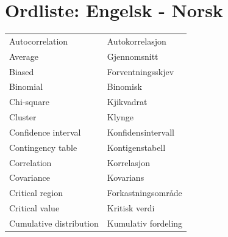 \section{Ordliste: Engelsk - Norsk}
\small
\begin{center}
\begin{tabular}{ll}
Autocorrelation & Autokorrelasjon  \\
Average         & Gjennomsnitt  \\
Biased          & Forventningsskjev \\
Binomial        & Binomisk \\
Chi-square      & Kjikvadrat \\
Cluster         & Klynge \\
Confidence interval & Konfidensintervall \\
Contingency table &   Kontigenstabell \\
Correlation    &  Korrelasjon \\
Covariance      & Kovarians \\
Critical region & Forkastningsområde \\
Critical value  & Kritisk verdi \\
Cumulative distribution & Kumulativ fordeling \\
\end{tabular}
\end{center}
